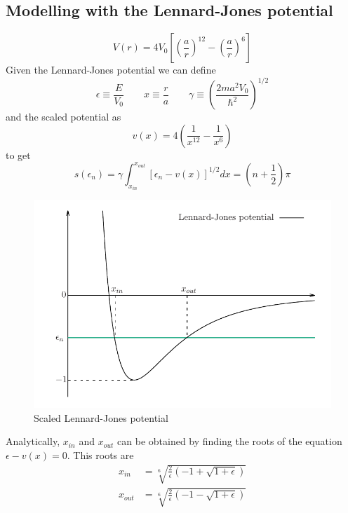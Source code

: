 \documentclass[11pt]{article}
\begin{document}
\subsection{Modelling with the Lennard-Jones potential}
\begin{equation*}
  V(r)= 4 V_0\left[\left(\frac{a}{r}\right)^{12}-\left(\frac{a}{r}\right)^{6}\right]
\end{equation*}
Given the Lennard-Jones potential we can define
\begin{equation*}
  \epsilon \equiv \frac{E}{V_0}\qquad x\equiv\frac{r}{a}\qquad \gamma \equiv \left(\frac{2ma^2V_0}{\hbar^2}\right)^{1/2}
\end{equation*}
and the scaled potential as
\begin{equation*}
  v(x)= 4\left(\frac{1}{x^{12}}-\frac{1}{x^6}\right)
\end{equation*}
to get
\begin{equation}
  s(\epsilon_n) = \gamma\int_{x_{in}}^{x_{out}} \left[\epsilon_n-v(x)\right]^{1/2} dx = \left(n+\frac{1}{2}\right)\pi
  \label{eqn:action}
\end{equation}
\begin{figure}[H]
  \centering
  \includegraphics[width=.8\linewidth]{potential-LJ}
  \caption{Scaled Lennard-Jones potential}
\label{fig:potential-Lj}
\end{figure}
Analytically, $x_{in}$ and $x_{out}$ can be obtained by finding the roots of the equation $\epsilon-v(x) = 0$. This roots are
\begin{align*}
  x_{in} &= \sqrt[6]{\frac{2}{\epsilon}\left(-1+\sqrt{1+\epsilon}\right)}\\
  x_{out} &= \sqrt[6]{\frac{2}{\epsilon}\left(-1-\sqrt{1+\epsilon}\right)}
\end{align*}
\end{document}
